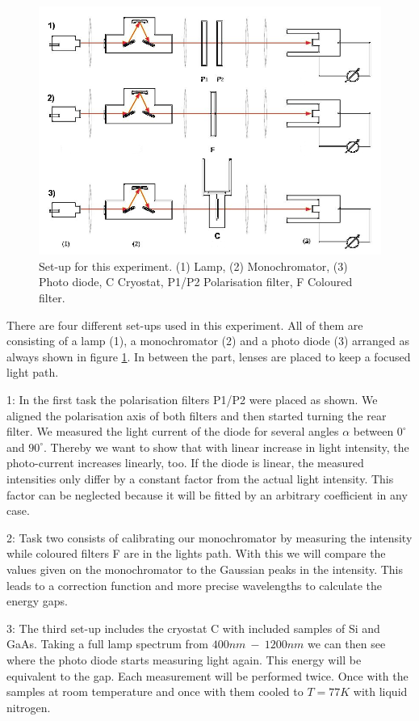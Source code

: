 \documentclass[]{article}
\begin{document}
\begin{figure}[H]
\centering
\includegraphics[width=.9\textwidth]{Plots/setup.png}
\caption{Set-up for this experiment. (1) Lamp, (2) Monochromator, (3) Photo diode, C Cryostat, P1/P2 Polarisation filter, F Coloured filter. }
\label{fig:setup}
\end{figure}

There are four different set-ups used in this experiment. All of them are consisting of a lamp (1), a monochromator (2) and a photo diode (3) arranged as always shown in figure \ref{fig:setup}. In between the part, lenses are placed to keep a focused light path.

1: In the first task the polarisation filters P1/P2 were placed as shown. We aligned the polarisation axis of both filters and then started turning the rear filter. We measured the light current of the diode for several angles $\alpha$ between $0^\circ$ and $90^\circ$. Thereby we want to show that with linear increase in light intensity, the photo-current increases linearly, too. %
If the diode is linear, the measured intensities only differ by a constant factor from the actual light intensity. This factor can be neglected because it will be fitted by an arbitrary coefficient in any case.

2: Task two consists of calibrating our monochromator by measuring the intensity while coloured filters F are in the lights path. With this we will compare the values given on the monochromator to the Gaussian peaks in the intensity. This leads to a correction function and more precise wavelengths to calculate the energy gaps.

3: The third set-up includes the cryostat C with included samples of Si and GaAs. Taking a full lamp spectrum from $400nm \ - \ 1200nm$ we can then see where the photo diode starts measuring light again. This energy will be equivalent to the gap. Each measurement will be performed twice. Once with the samples at room temperature and once with them cooled to  $T=77K$ with liquid nitrogen.
\end{document}
